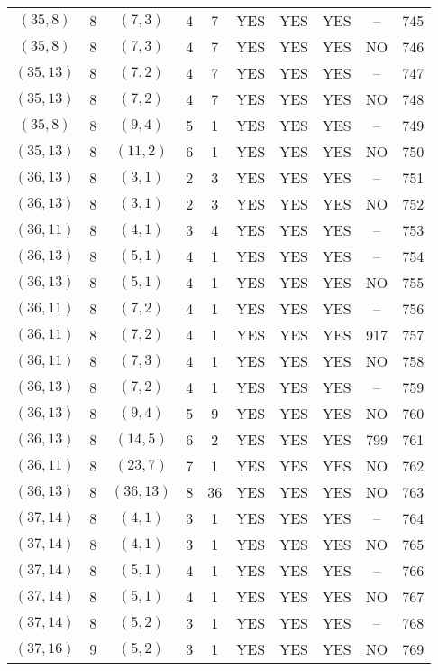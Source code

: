 \begin{longtable}{|c|c|c|c|c|c|c|c|c|c|}
$(35, 8)$ & 8 & $(7, 3)$ & 4 & 7 & YES & YES & YES & -- & 745\\
$(35, 8)$ & 8 & $(7, 3)$ & 4 & 7 & YES & YES & YES & NO & 746\\
$(35, 13)$ & 8 & $(7, 2)$ & 4 & 7 & YES & YES & YES & -- & 747\\
$(35, 13)$ & 8 & $(7, 2)$ & 4 & 7 & YES & YES & YES & NO & 748\\
$(35, 8)$ & 8 & $(9, 4)$ & 5 & 1 & YES & YES & YES & -- & 749\\
$(35, 13)$ & 8 & $(11, 2)$ & 6 & 1 & YES & YES & YES & NO & 750\\
$(36, 13)$ & 8 & $(3, 1)$ & 2 & 3 & YES & YES & YES & -- & 751\\
$(36, 13)$ & 8 & $(3, 1)$ & 2 & 3 & YES & YES & YES & NO & 752\\
$(36, 11)$ & 8 & $(4, 1)$ & 3 & 4 & YES & YES & YES & -- & 753\\
$(36, 13)$ & 8 & $(5, 1)$ & 4 & 1 & YES & YES & YES & -- & 754\\
$(36, 13)$ & 8 & $(5, 1)$ & 4 & 1 & YES & YES & YES & NO & 755\\
$(36, 11)$ & 8 & $(7, 2)$ & 4 & 1 & YES & YES & YES & -- & 756\\
$(36, 11)$ & 8 & $(7, 2)$ & 4 & 1 & YES & YES & YES & 917 & 757\\
$(36, 11)$ & 8 & $(7, 3)$ & 4 & 1 & YES & YES & YES & NO & 758\\
$(36, 13)$ & 8 & $(7, 2)$ & 4 & 1 & YES & YES & YES & -- & 759\\
$(36, 13)$ & 8 & $(9, 4)$ & 5 & 9 & YES & YES & YES & NO & 760\\
$(36, 13)$ & 8 & $(14, 5)$ & 6 & 2 & YES & YES & YES & 799 & 761\\
$(36, 11)$ & 8 & $(23, 7)$ & 7 & 1 & YES & YES & YES & NO & 762\\
$(36, 13)$ & 8 & $(36, 13)$ & 8 & 36 & YES & YES & YES & NO & 763\\
$(37, 14)$ & 8 & $(4, 1)$ & 3 & 1 & YES & YES & YES & -- & 764\\
$(37, 14)$ & 8 & $(4, 1)$ & 3 & 1 & YES & YES & YES & NO & 765\\
$(37, 14)$ & 8 & $(5, 1)$ & 4 & 1 & YES & YES & YES & -- & 766\\
$(37, 14)$ & 8 & $(5, 1)$ & 4 & 1 & YES & YES & YES & NO & 767\\
$(37, 14)$ & 8 & $(5, 2)$ & 3 & 1 & YES & YES & YES & -- & 768\\
$(37, 16)$ & 9 & $(5, 2)$ & 3 & 1 & YES & YES & YES & NO & 769\\

\end{longtable}

